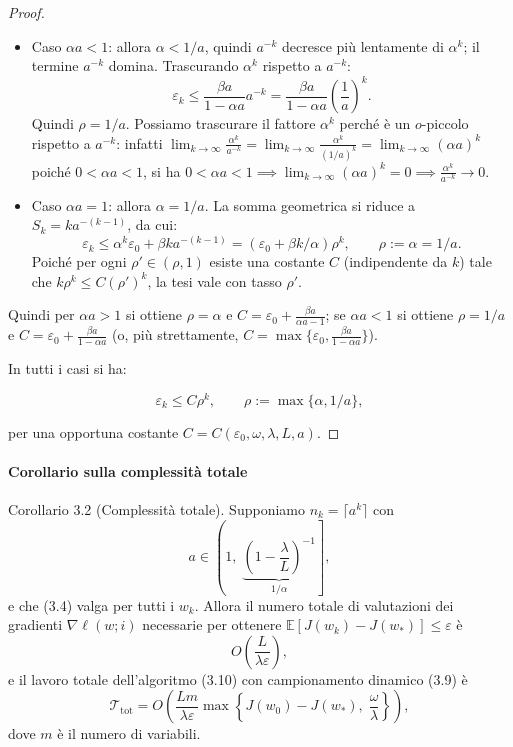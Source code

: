 \documentclass[a4paper,12pt]{article}
\begin{document}
\begin{proof}
\begin{itemize}
\item Caso $\alpha a < 1$: allora $\alpha < 1/a$, quindi $a^{-k}$ decresce più lentamente di $\alpha^k$; il termine $a^{-k}$ domina. Trascurando $\alpha^k$ rispetto a $a^{-k}$:
\[
\varepsilon_k \le \frac{\beta a}{1 - \alpha a} a^{-k}
= \frac{\beta a}{1 - \alpha a} \left(\frac{1}{a}\right)^k.
\]
Quindi $\rho = 1/a$.
Possiamo trascurare il fattore $\alpha^k$ perché è un $o$-piccolo rispetto a $a^{-k}$: infatti $\lim_{k \to \infty} \frac{\alpha^k}{a^{-k}}
= \lim_{k \to \infty} \frac{\alpha^k}{(1/a)^k}
= \lim_{k \to \infty} (\alpha a)^k$
poiché $0<\alpha a < 1$, si ha $0 < \alpha a < 1 \implies \lim_{k \to \infty} (\alpha a)^k = 0 \implies \frac{\alpha^k}{a^{-k}} \to 0$.
\item Caso $\alpha a = 1$: allora $\alpha = 1/a$. La somma geometrica si riduce a $S_k = k a^{-(k-1)}$, da cui:
\[
\varepsilon_k \le \alpha^k \varepsilon_0 + \beta k a^{-(k-1)} = (\varepsilon_0 + \beta k/\alpha)\rho^k,
\qquad\rho:=\alpha=1/a.
\]
Poich\'e per ogni $\rho' \in (\rho,1)$ esiste una costante $C$ (indipendente da $k$) tale che $k\rho^k \le C(\rho')^k$, la tesi vale con tasso $\rho'$.
\end{itemize}
 Quindi per $\alpha a>1$ si ottiene $\rho=\alpha$ e $C=\varepsilon_0+\frac{\beta a}{\alpha a-1}$; se $\alpha a<1$ si ottiene $\rho=1/a$ e $C=\varepsilon_0+\frac{\beta a}{1-\alpha a}$ (o, più strettamente, $C=\max\{\varepsilon_0,\frac{\beta a}{1-\alpha a}\}$).

In tutti i casi si ha:

\begin{equation}
\varepsilon_k \le C \rho^k, \qquad \rho := \max\{\alpha, 1/a\}, \tag{3.25}
\end{equation}

per una opportuna costante $C = C(\varepsilon_0, \omega, \lambda, L, a)$.


\end{proof}
\paragraph{Corollario sulla complessità totale}

\begin{corollarybox}
  Corollario 3.2 (Complessità totale).
  Supponiamo \(n_k = \lceil a^k \rceil\) con
  \[
  a \in \left(1,\; \underbrace{\left(1 - \frac{\lambda}{L}\right)^{-1}}_{1/\alpha}\right],
  \]
  e che (3.4) valga per tutti i \(w_k\). Allora il numero totale di valutazioni dei gradienti \(\nabla \ell(w;i)\) necessarie per ottenere \(\mathbb{E}[J(w_k) - J(w_*)] \le \varepsilon\) è
  \[
  O\!\left(\frac{L}{\lambda \varepsilon}\right), \tag{3.26}
  \]
  e il lavoro totale dell'algoritmo (3.10) con campionamento dinamico (3.9) è
  \[
  \mathcal{T}_{\mathrm{tot}} = O\!\left(\frac{L m}{\lambda \varepsilon} \max\left\{J(w_0) - J(w_*),\; \frac{\omega}{\lambda}\right\}\right), \tag{3.27}
  \]
  dove \(m\) è il numero di variabili.
\end{corollarybox}
\end{document}
